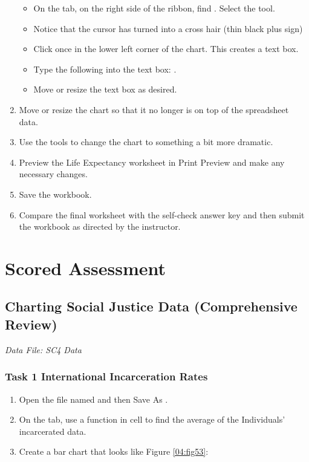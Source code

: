 \begin{enumerate}[resume]
	\begin{itemize}
		\item On the  tab, on the right side of the ribbon, find . Select the  tool.
		\item Notice that the cursor has turned into a cross hair (thin black plus sign)
		\item Click once in the lower left corner of the chart. This creates a text box.
		\item Type the following into the text box: .
		\item Move or resize the text box as desired.
	\end{itemize}
	
	\item Move or resize the chart so that it no longer is on top of the spreadsheet data.
	\item Use the  tools to change the chart to something a bit more dramatic.
	\item Preview the Life Expectancy worksheet in Print Preview and make any necessary changes.
	\item Save the  workbook.
	\item Compare the final worksheet with the self-check answer key and then submit the  workbook as directed by the instructor.
\end{enumerate}

\section{Scored Assessment}

\subsection{Charting Social Justice Data (Comprehensive Review)}

\textit{Data File: SC4 Data}

\subsubsection{Task 1 International Incarceration Rates}

\begin{enumerate}
	\item Open the file named  and then Save As .
	\item On the  tab, use a function in cell  to find the average of the Individuals' incarcerated data.
	\item Create a bar chart that looks like Figure \ref{04:fig53}:
\end{enumerate}

